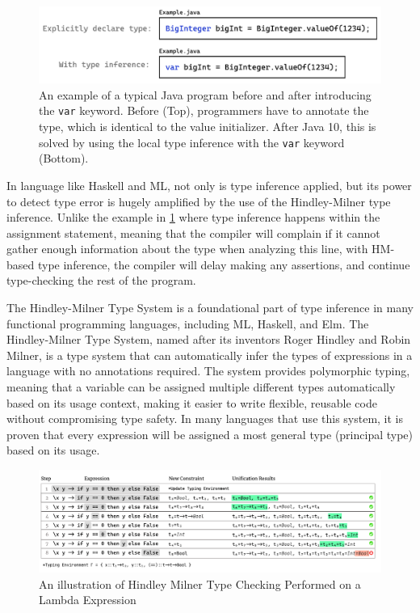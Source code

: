 \begin{figure}[hbt]
  \includegraphics[width=\linewidth]{ExampleJava}
  \caption{
    \label{fig:example-java}
      An example of a typical Java program before and after introducing the \texttt{var} keyword. Before (Top), programmers have to annotate the type, which is identical to the value initializer. After Java 10, this is solved by using the local type inference with the \texttt{var} keyword (Bottom).
    }
\end{figure}

In language like Haskell and ML, not only is type inference applied, but its power to detect type error is hugely amplified by the use of the Hindley-Milner type inference. Unlike the example in \ref{fig:example-java} where type inference happens within the assignment statement, meaning that the compiler will complain if it cannot gather enough information about the type when analyzing this line, with HM-based type inference, the compiler will delay making any assertions, and continue type-checking the rest of the program. 

The Hindley-Milner Type System \cite{Damas1982-zw} is a foundational part of type inference in many functional programming languages, including ML, Haskell, and Elm. The Hindley-Milner Type System, named after its inventors Roger Hindley and Robin Milner, is a type system that can automatically infer the types of expressions in a language with no annotations required. The system provides polymorphic typing, meaning that a variable can be assigned multiple different types automatically based on its usage context, making it easier to write flexible, reusable code without compromising type safety. In many languages that use this system, it is proven that every expression will be assigned a most general type (principal type) based on its usage. 



\begin{figure}[hbt]
    \includegraphics[width=\linewidth]{HindleyMilner}
    \caption{
      \label{fig:hindley-milner}
        An illustration of Hindley Milner Type Checking Performed on a Lambda Expression}
\end{figure}


